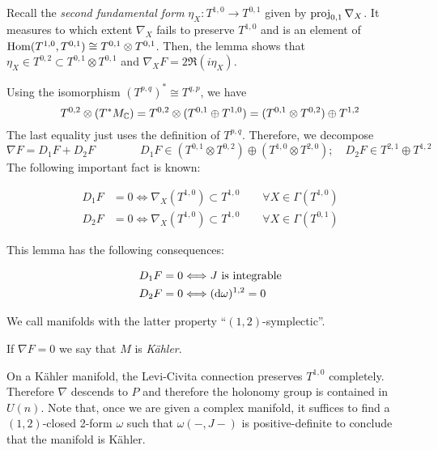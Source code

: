 \documentclass{scrartcl}
\begin{document}
Recall the \emph{second fundamental form} $\eta_X:T^{1,0}\to T^{0,1}$ given by $\operatorname{proj}_{0,1}\nabla_X$. It measures to which extent $\nabla_X$ fails to preserve $T^{1,0}$ and is an element of $\operatorname{Hom}(T^{1,0},T^{0,1})\cong T^{0,1}\otimes T^{0,1}$. Then, the lemma shows that $\eta_X\in T^{0,2}\subset T^{0,1}\otimes T^{0,1}$ and $\nabla_XF=2\Re(i\eta_X)$.

\medskip


Using the isomorphism $(T^{p,q})^*\cong T^{q,p}$, we have
\begin{equation*}
T^{0,2}\otimes (T^*M_{\mathbb{C}})=T^{0,2}\otimes (T^{0,1}\oplus T^{1,0})
=(T^{0,1}\otimes T^{0,2})\oplus T^{1,2}
\end{equation*}
The last equality just uses the definition of $T^{p,q}$. Therefore, we decompose
\begin{equation*}
	\nabla F=D_1 F+D_2 F \qquad \qquad D_1F\in (T^{0,1}\otimes T^{0,2})\oplus(T^{1,0}\otimes T^{2,0});\quad 
	D_2F\in T^{2,1}\oplus T^{1,2}
\end{equation*}
The following important fact is known:

\begin{lem}
	\begin{align*}
		D_1F&=0\Longleftrightarrow \nabla_X(T^{1,0})\subset T^{1,0} \qquad \forall X\in\Gamma(T^{1,0}) \\
		D_2F&=0\Longleftrightarrow \nabla_X(T^{1,0})\subset T^{1,0} \qquad \forall X\in\Gamma(T^{0,1})
	\end{align*}
\end{lem}

This lemma has the following consequences:

\begin{prop}
	\begin{align*}
		D_1F&=0\Longleftrightarrow J\text{ is integrable}\\
		D_2F&=0\Longleftrightarrow (\mathrm{d}\omega)^{1,2}=0
	\end{align*}
\end{prop}

\begin{rem}
	We call manifolds with the latter property ``$(1,2)$-symplectic''.
\end{rem}

\begin{mydef}
	If $\nabla F=0$ we say that $M$ is \emph{K\"{a}hler}.
\end{mydef}

On a K\"{a}hler manifold, the Levi-Civita connection preserves $T^{1,0}$ completely. Therefore $\nabla$ descends to $P$ and therefore the holonomy group is contained in $U(n)$. Note that, once we are given a complex manifold, it suffices to find a $(1,2)$-closed 2-form $\omega$ such that $\omega(-,J-)$ is positive-definite to conclude that the manifold is K\"{a}hler.
\end{document}
